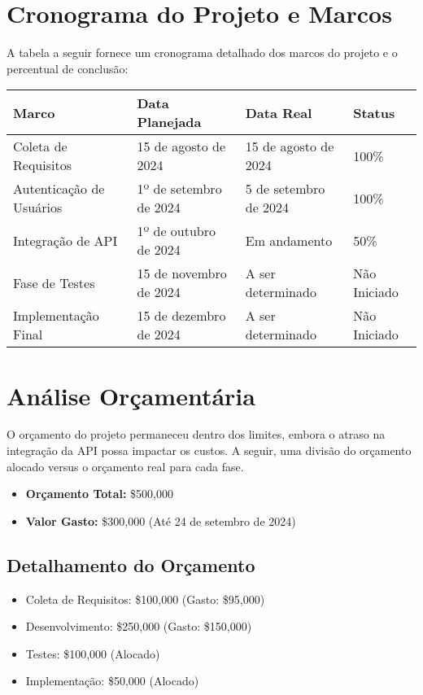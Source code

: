 \documentclass[12pt]{article}
\begin{document}
\section{Cronograma do Projeto e Marcos}
A tabela a seguir fornece um cronograma detalhado dos marcos do projeto e o percentual de conclusão:

\begin{center}
\begin{table}[h]
\small
\begin{tabular}{|m{4cm}|m{4cm}|m{4cm}|m{2cm}|}
\hline
\textbf{Marco} & \textbf{Data Planejada} & \textbf{Data Real} & \textbf{Status} \\
\hline
Coleta de Requisitos & 15 de agosto de 2024 & 15 de agosto de 2024 & 100\% \\
\hline
Autenticação de Usuários & 1º de setembro de 2024 & 5 de setembro de 2024 & 100\% \\
\hline
Integração de API & 1º de outubro de 2024 & Em andamento & 50\% \\
\hline
Fase de Testes & 15 de novembro de 2024 & A ser determinado & Não Iniciado \\
\hline
Implementação Final & 15 de dezembro de 2024 & A ser determinado & Não Iniciado \\
\hline
\end{tabular}
\end{table}
\end{center}

\section{Análise Orçamentária}
O orçamento do projeto permaneceu dentro dos limites, embora o atraso na integração da API possa impactar os custos. A seguir, uma divisão do orçamento alocado versus o orçamento real para cada fase.

\begin{itemize}
    \item \textbf{Orçamento Total:} \$500,000
    \item \textbf{Valor Gasto:} \$300,000 (Até 24 de setembro de 2024)
\end{itemize}

\subsection*{Detalhamento do Orçamento}
\begin{itemize}
    \item Coleta de Requisitos: \$100,000 (Gasto: \$95,000)
    \item Desenvolvimento: \$250,000 (Gasto: \$150,000)
    \item Testes: \$100,000 (Alocado)
    \item Implementação: \$50,000 (Alocado)
\end{itemize}
\end{document}
